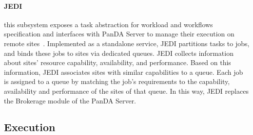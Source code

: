 
\paragraph{\textbf{JEDI}} this subsystem exposes a task abstraction for workload
and workflows specification and interfaces with PanDA Server to manage their
execution on remote sites~\cite{borodin2015scaling}. Implemented as a standalone
service, JEDI partitions tasks to jobs, and binds these jobs to sites via
dedicated queues. JEDI collects information about sites' resource capability,
availability, and performance. Based on this information, JEDI associates sites
with similar capabilities to a queue. Each job is assigned to a queue by
matching the job's requirements to the capability, availability and performance
of the sites of that queue. In this way, JEDI replaces the Brokerage module of
the PanDA Server.


\subsection{Execution}
\label{ssec:panda_exec}


